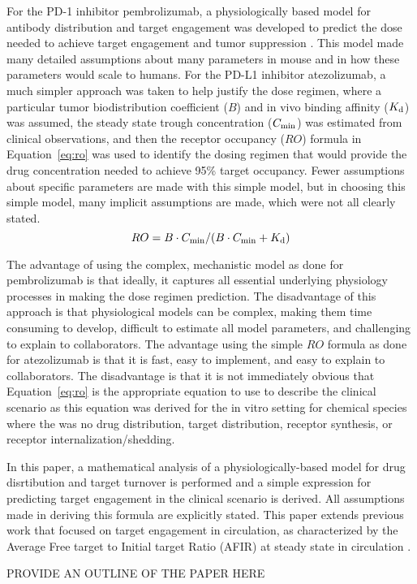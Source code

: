 For the PD-1 inhibitor pembrolizumab, a physiologically based model for antibody distribution and target engagement was developed to predict the dose needed to achieve target engagement and tumor suppression \cite{lindauer17}.  This model made many detailed assumptions about many parameters in mouse and in how these parameters would scale to humans.  For the PD-L1 inhibitor atezolizumab, a much simpler approach was taken to help justify the dose regimen, where a particular tumor biodistribution coefficient ($B$) and in vivo binding affinity ($K_\text{d}$) was assumed, the steady state trough concentration ($C_\text{min}$) was estimated from clinical observations, and then the receptor occupancy ($RO$) formula in Equation~\ref{eq:ro} was used to identify the dosing regimen that would provide the drug concentration needed to achieve 95\% target occupancy.  Fewer assumptions about specific parameters are made with this simple model, but in choosing this simple model, many implicit assumptions are made, which were not all clearly stated.
\begin{equation}
RO = B\cdot C_\text{min}/(B\cdot C_\text{min}+K_\text{d})
\label{eq:ro}
\end{equation}

The advantage of using the complex, mechanistic model as done for pembrolizumab is that ideally, it captures all essential underlying physiology processes in making the dose regimen prediction.  The disadvantage of this approach is that physiological models can be complex, making them time consuming to develop, difficult to estimate all model parameters, and challenging to explain to collaborators.  The advantage using the simple $RO$ formula as done for atezolizumab is that it is fast, easy to implement, and easy to explain to collaborators.  The disadvantage is that it is not immediately obvious that Equation~\ref{eq:ro} is the appropriate equation to use to describe the clinical scenario as this equation was derived for the in vitro setting for chemical species\cite{boeynaems80} where the was no drug distribution, target distribution, receptor synthesis, or receptor internalization/shedding.

In this paper, a mathematical analysis of a physiologically-based model for drug disrtibution and target turnover  is performed and a simple expression for predicting target engagement in the clinical scenario is derived.  All assumptions made in deriving this formula are explicitly stated.  This paper extends previous work that focused on target engagement in circulation, as characterized by the Average Free target to Initial target Ratio (AFIR) at steady state in circulation \cite{stein17}.

PROVIDE AN OUTLINE OF THE PAPER HERE
